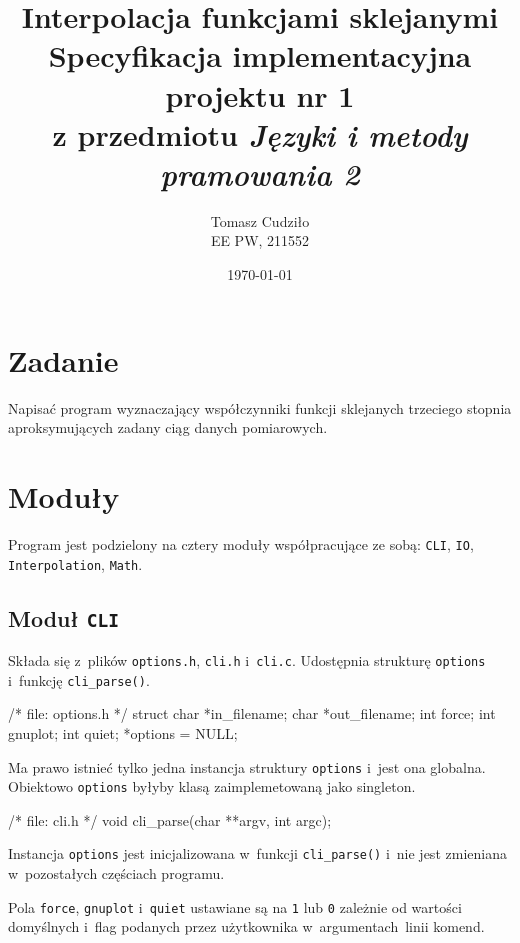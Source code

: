 \documentclass[12pt,a4paper]{article}
\newcommand{\p}[1]{\texttt{#1}}
\begin{document}
\title{ 
  Interpolacja funkcjami sklejanymi\\
  {\normalsize Specyfikacja implementacyjna projektu nr 1}\\\vspace{-12pt}
  {\normalsize z przedmiotu \emph{Języki i metody pramowania 2}}
}
\author{
  Tomasz Cudziło\\
  {\small EE PW, 211552}
}
\date{\today}
\maketitle

\section*{Zadanie}
\label{sec:zadanie}

Napisać program wyznaczający współczynniki funkcji sklejanych trzeciego stopnia
aproksymujących zadany ciąg danych pomiarowych.

\vspace{24pt}

\section{Moduły}
Program jest podzielony na cztery moduły współpracujące ze sobą: \p{CLI},
\p{IO}, \p{Interpolation}, \p{Math}.

\subsection{Moduł \p{CLI}}
Składa się z~plików \p{options.h}, \p{cli.h} i~\p{cli.c}. Udostępnia strukturę
\p{options} i~funkcję \p{cli\_parse()}.
\begin{SmallVerbatim}
    /* file: options.h */
    struct {
      char *in_filename;
      char *out_filename;
      int force;
      int gnuplot;
      int quiet;
    } *options = NULL;
\end{SmallVerbatim}
Ma prawo istnieć tylko jedna instancja struktury \p{options} i~jest ona
globalna. Obiektowo \p{options} byłyby klasą zaimplemetowaną jako singleton.
\begin{SmallVerbatim}
    /* file: cli.h */
    void cli_parse(char **argv, int argc);
\end{SmallVerbatim}
Instancja \p{options} jest inicjalizowana w~funkcji \p{cli\_parse()} i~nie jest
zmieniana w~pozostałych częściach programu.

Pola \p{force}, \p{gnuplot} i~\p{quiet} ustawiane są na \p{1} lub \p{0}
zależnie od wartości domyślnych i~flag podanych przez użytkownika
w~argumentach~linii komend.
\end{document}
